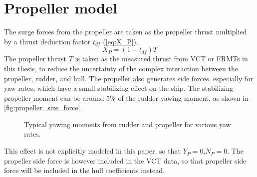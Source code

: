 \section{Propeller model} \label{sec:propeller}
The surge forces from the propeller are taken as the propeller thrust multiplied by a thrust deduction factor $t_{df}$ (\autoref{eq:X_P}).
\begin{equation}
    \label{eq:X_P}
    X_P = (1-t_{df})T
\end{equation}
The propeller thrust $T$ is taken as the measured thrust from VCT or FRMTs in this thesis, to reduce the uncertainty of the complex interaction between the propeller, rudder, and hull. The propeller also generates side forces, especially for yaw rates, which have a small stabilizing effect on the ship. The stabilizing propeller moment can be around 5\% of the rudder yawing moment, as shown in \autoref{fig:propeller_size_force}.
\begin{figure}[h]
    \centering
    
    \caption{Typical yawing moments from rudder and propeller for various yaw rates.}
    \label{fig:propeller_size_force}
\end{figure}
This effect is not explicitly modeled in this paper, so that $Y_P=0$,$N_P=0$. The propeller side force is however included in the VCT data, so that propeller side force will be included in the hull coefficients instead.
